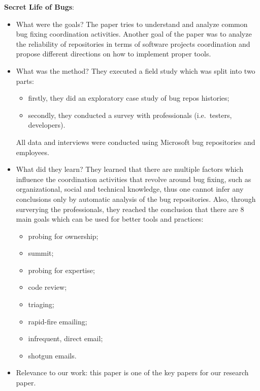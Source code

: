\documentclass{mprop}
\begin{document}
\textbf{Secret Life of Bugs}\cite{aranda2009secret}:
\begin{itemize}
\item What were the goals?
  The paper tries to understand and analyze common bug fixing coordination
  activities. Another goal of the paper was to analyze the reliability of
  repositories in terms of software projects coordination and propose
  different directions on how to implement proper tools.
\item What was the method?
  They executed a field study which was split into two parts:
  \begin{itemize}
  \item firstly, they did an exploratory case study of bug repos histories;
  \item secondly, they conducted a survey with professionals (i.e.\ testers,
    developers).
  \end{itemize}
  All data and interviews were conducted using Microsoft bug repositories and
  employees.
\item What did they learn?
  They learned that there are multiple factors which influence the coordination
  activities that revolve around bug fixing, such as organizational, social and
  technical knowledge, thus one cannot infer any conclusions only by automatic
  analysis of the bug repositories. Also, through surverying the professionals,
  they reached the conclusion that there are 8 main goals which can be used for
  better tools and practices:
  \begin{itemize}
  \item probing for ownership;
  \item summit;
  \item probing for expertise;
  \item code review;
  \item triaging;
  \item rapid-fire emailing;
  \item infrequent, direct email;
  \item shotgun emails.
  \end{itemize}
\item Relevance to our work: this paper is one of the key papers for our
  research paper.
\end{itemize}
\end{document}
